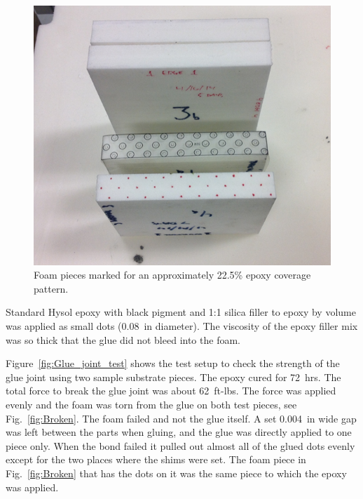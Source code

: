 \begin{figure}[ht]
    \centering
    \includegraphics[width=1.0\linewidth]{images/Pattern.png}
    \caption{Foam pieces marked for an approximately 22.5\% epoxy coverage pattern.}
    \label{fig:Pattern}
\end{figure}

Standard Hysol epoxy with black pigment and 1:1 silica filler to epoxy by volume was applied as small dots (0.08~in
diameter). The viscosity of the epoxy filler mix was so thick that the glue did not bleed into the foam. 

Figure~\ref{fig:Glue_joint_test} shows the test setup to check the strength of the glue joint using two sample
substrate pieces. The epoxy cured for 72~hrs. The total force to break the glue joint was about 62~ft-lbs. The
force was applied evenly and the foam was torn from the glue on both test pieces, see Fig.~\ref{fig:Broken}. The
foam failed and not the glue itself. A set 0.004~in wide gap was left between the parts when gluing, and the glue
was directly applied to one piece only. When the bond failed it pulled out almost all of the glued dots evenly except
for the two places where the shims were set. The foam piece in Fig.~\ref{fig:Broken} that has the dots on it was
the same piece to which the epoxy was applied.

